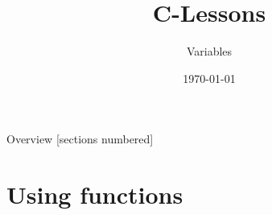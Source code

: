 


\title{C-Lessons}
\subtitle{Variables}
\date{\today}

\usetikzlibrary{tikzmark}


\begin{frame}
	\titlepage
\end{frame}
\begin{frame}{Overview}
	[sections numbered]
	\tableofcontents
\end{frame}

\section{Using functions}

